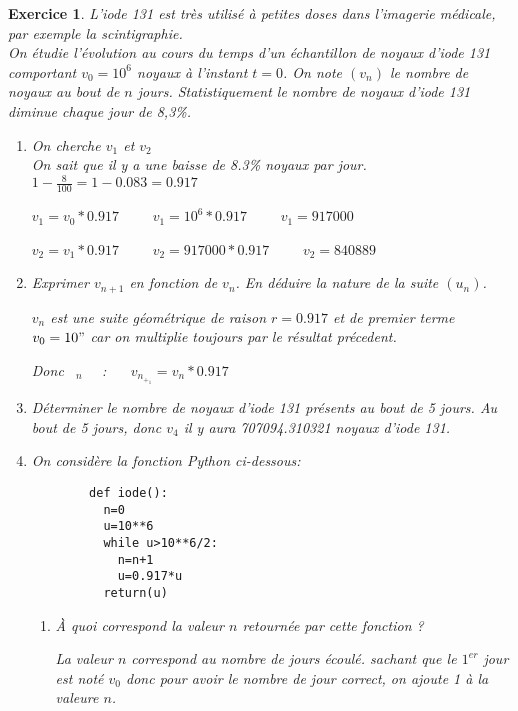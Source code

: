 \documentclass[10pt,a4paper]{article}
\theoremstyle{break}
\newtheorem{exo}{Exercice}
\begin{document}
\begin{exo}
L'iode 131 est très utilisé à petites doses dans l'imagerie médicale, par exemple la scintigraphie.\\
On étudie l'évolution au cours du temps d'un échantillon de noyaux d'iode 131 comportant $v_0 = 10^6$ noyaux à l'instant $t = 0$. On note $(v_n)$ le nombre de noyaux au bout de $n$ jours. Statistiquement le nombre de noyaux d'iode 131 diminue chaque jour de 8,3\%.

	\begin{enumerate}
		
		\item On cherche $v_{1}$ et $v_{2}$\\
				On sait que il y a une baisse de 8.3\% noyaux par jour.
				 $ 1 - \frac{8}{100} = 1-0.083 = 0.917$

				$v_1 = v_0*0.917$~~~~
				$v_1 = 10^6*0.917$~~~~
				$v_1 = 917000$ \par
				
				$v_2 = v_1*0.917$~~~~
				$v_2 = 917000*0.917$~~~~
				$v_2 = 840889$\par
		\item Exprimer $v_{n+1}$ en fonction de $v_{n}$. En déduire la nature de la suite $\left(u_{n}\right)$. \par
			$v_n$ est une suite géométrique de raison $r = 0.917 $ et de premier terme $v_0 = 10"$ car on multiplie toujours par le résultat précedent. \par
			Donc \forall~$_n$~ \in~: ~~
			$v_n_+_1 = v_n*0.917$\par
			
		

		\item  Déterminer le nombre de noyaux d'iode 131 présents au bout de 5 jours. 
				Au bout de 5 jours, donc $v_4$ il y aura 707094.310321 noyaux d'iode 131.
	
		\item On considère la fonction Python ci-dessous:\\
			\begin{lstlisting}
		def iode():
		  n=0
		  u=10**6
		  while u>10**6/2:
		    n=n+1
		    u=0.917*u
		  return(u)
		\end{lstlisting}
			\begin{enumerate}
			\item À quoi correspond la valeur $n$ retournée par cette fonction ? \par
				La valeur $n$ correspond au nombre de jours écoulé. sachant que le $1^{er}$ jour est noté $v_0$ donc pour avoir le nombre de jour correct, on ajoute 1 à la valeure $n$.
			 

\end{enumerate}
\end{enumerate}
\end{exo}
\end{document}

